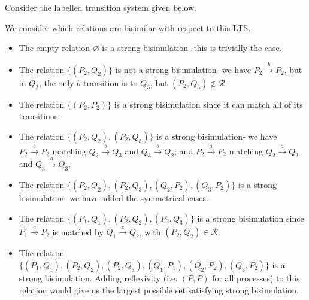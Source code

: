 \documentclass[a4paper, openany]{memoir}
\theoremstyle{definition}
\begin{document}
    Consider the labelled transition system given below.
    \begin{figure}[H]
        \centering
    \end{figure}
    \noindent We consider which relations are bisimilar with respect to this LTS.
    \begin{itemize}
        \item The empty relation $\varnothing$ is a strong bisimulation- this is trivially the case.
        \item The relation $\{(P_2, Q_2)\}$ is not a strong bisimulation- we have $P_2 \xrightarrow{b} P_2$, but in $Q_2$, the only $b$-transition is to $Q_3$, but $(P_2, Q_3) \not\in \mathcal{R}$.
        \item The relation $\{(P_2, P_2)\}$ is a strong bisimulation since it can match all of its transitions.
        \item The relation $\{(P_2, Q_2), (P_2, Q_3)\}$ is a strong bisimulation- we have $P_2 \xrightarrow{b} P_2$ matching $Q_2 \xrightarrow{b} Q_3$ and $Q_3 \xrightarrow{b} Q_2$; and $P_2 \xrightarrow{a} P_2$ matching $Q_2 \xrightarrow{a} Q_2$ and $Q_3 \xrightarrow{a} Q_3$.
        \item The relation $\{(P_2, Q_2), (P_2, Q_3), (Q_2, P_2), (Q_3, P_2)\}$ is a strong bisimulation- we have added the symmetrical cases.
        \item The relation $\{(P_1, Q_1), (P_2, Q_2), (P_2, Q_3)\}$ is a strong bisimulation since $P_1 \xrightarrow{c} P_2$ is matched by $Q_1 \xrightarrow{c} Q_2$, with $(P_2, Q_2) \in \mathcal{R}$.
        \item The relation $\{(P_1, Q_1), (P_2, Q_2), (P_2, Q_3), (Q_1, P_1), (Q_2, P_2), (Q_3, P_2)\}$ is a strong bisimulation. Adding reflexivity (i.e. $(P, P)$ for all processes) to this relation would give us the largest possible set satisfying strong bisimulation.
    \end{itemize}
\end{document}
